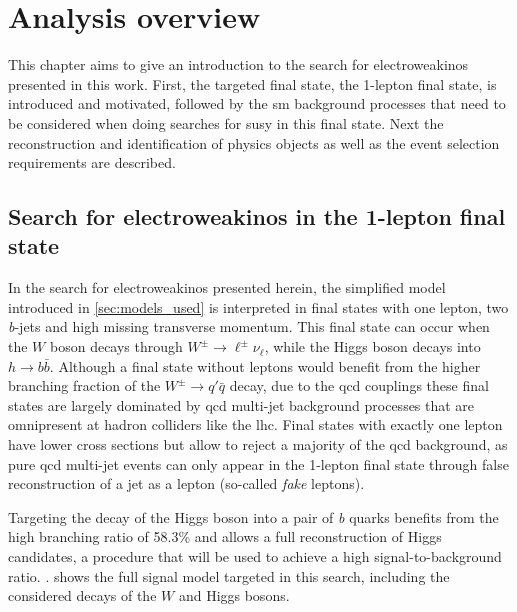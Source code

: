 
\chapter{Analysis overview}\label{ch:1lepton}

\ifpdf
    \graphicspath{{chapter-analysis/Figs/Raster/}{chapter-analysis/Figs/PDF/}{chapter-analysis/Figs/}}
\else
    \graphicspath{{chapter-analysis/Figs/Vector/}{chapter-analysis/Figs/}}
\fi


This chapter aims to give an introduction to the search for electroweakinos presented in this work. First, the targeted final state, the 1-lepton final state, is introduced and motivated, followed by the \gls{sm} background processes that need to be considered when doing searches for \gls{susy} in this final state. Next the reconstruction and identification of physics objects as well as the event selection requirements are described.

\section{Search for electroweakinos in the 1-lepton final state}

In the search for electroweakinos presented herein, the simplified model introduced in \cref{sec:models_used} is interpreted in final states with one lepton, two \textit{b}-jets and high missing transverse momentum. This final state can occur when the $W$ boson decays through $W^\pm\rightarrow\ell^\pm\nu_\ell$, while the Higgs boson decays into $h\rightarrow b\bar{b}$. Although a final state without leptons would benefit from the higher branching fraction of the $W^\pm\rightarrow q'\bar{q}$ decay, due to the \gls{qcd} couplings these final states are largely dominated by \gls{qcd} multi-jet background processes that are omnipresent at hadron colliders like the \gls{lhc}. Final states with exactly one lepton have lower cross sections but allow to reject a majority of the \gls{qcd} background, as pure \gls{qcd} multi-jet events can only appear in the 1-lepton final state through false reconstruction of a jet as a lepton (so-called \textit{fake} leptons). 

Targeting the decay of the Higgs boson into a pair of \textit{b} quarks benefits from the high branching ratio of 58.3\% and allows a full reconstruction of Higgs candidates, a procedure that will be used to achieve a high signal-to-background ratio. .  shows the full signal model targeted in this search, including the considered decays of the $W$ and Higgs bosons. 

